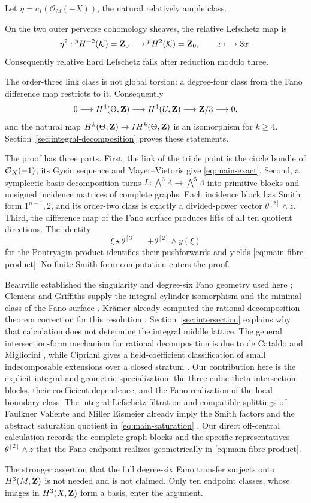 Let \(\eta=c_1(\mathcal O_M(-X))\), the natural relatively ample class.

\begin{corollary}
\label{cor:modular-rhl}
On the two outer perverse cohomology sheaves, the relative Lefschetz map is
\[
 \eta^2:{}^pH^{-2}(\mathcal K)=\mathbf Z_0
 \longrightarrow{}^pH^2(\mathcal K)=\mathbf Z_0,
 \qquad x\longmapsto3x.
\]
Consequently relative hard Lefschetz fails after reduction modulo three.
\end{corollary}

The order-three link class is not global torsion: a degree-four class from
the Fano difference map restricts to it.  Consequently
\[
 0\longrightarrow H^4(\Theta,\mathbf Z)\longrightarrow H^4(U,\mathbf Z)
 \longrightarrow\mathbf Z/3\longrightarrow0,
\]
and the natural map \(H^k(\Theta,\mathbf Z)\to IH^k(\Theta,\mathbf Z)\) is an isomorphism
for \(k\geq4\).  Section~\ref{sec:integral-decomposition} proves these
statements.

The proof has three parts.  First, the link of the triple point is the circle
bundle of \(\mathcal O_X(-1)\); its Gysin sequence and Mayer--Vietoris give
\eqref{eq:main-exact}.  Second, a symplectic-basis decomposition turns
\(L:\bigwedge^3\Lambda\to\bigwedge^5\Lambda\) into primitive blocks and
unsigned incidence matrices of complete graphs.  Each incidence block has
Smith form \(1^{n-1},2\), and its order-two class is exactly a divided-power
vector \(\theta^{[2]}\wedge z\).  Third, the difference map of the Fano
surface produces lifts of all ten quotient directions.  The identity
\[
 \xi\star\theta^{[3]}=\pm\theta^{[2]}\wedge y(\xi)
\]
for the Pontryagin product identifies their pushforwards and yields
\eqref{eq:main-fibre-product}.  No finite Smith-form computation enters the
proof.

Beauville established the singularity and degree-six Fano geometry used
here \cite{BeauvilleTheta}; Clemens and Griffiths supply the integral
cylinder isomorphism and the minimal class of the Fano surface
\cite{ClemensGriffiths}.  Krämer already computed the rational
decomposition-theorem correction for this resolution
\cite[Corollary~6]{KraemerE6}; Section~\ref{sec:intersection} explains why
that calculation does not determine the integral middle lattice.  The
general intersection-form mechanism for rational decomposition is due to de
Cataldo and Migliorini \cite{deCataldoMigliorini}, while Cipriani gives a
field-coefficient classification of small indecomposable extensions over a
closed stratum \cite{Cipriani}.  Our contribution here is the explicit
integral and geometric specialization: the three cubic-theta intersection
blocks, their coefficient dependence, and the Fano realization of the local
boundary class.  The
integral Lefschetz filtration and compatible splittings of Faulkner Valiente
and Miller Eismeier already imply the Smith factors and the abstract
saturation quotient in \eqref{eq:main-saturation}
\cite[Theorem~2.9, Corollary~2.10, and Proposition~2.14]{FaulknerMiller}.
Our direct off-central calculation records the complete-graph blocks and the
specific representatives \(\theta^{[2]}\wedge z\) that the Fano endpoint
realizes geometrically in \eqref{eq:main-fibre-product}.

The stronger assertion that the full degree-six Fano transfer surjects onto
\(H^3(M,\mathbf Z)\) is not needed and is not claimed.  Only ten endpoint classes,
whose images in \(H^3(X,\mathbf Z)\) form a basis, enter the argument.
